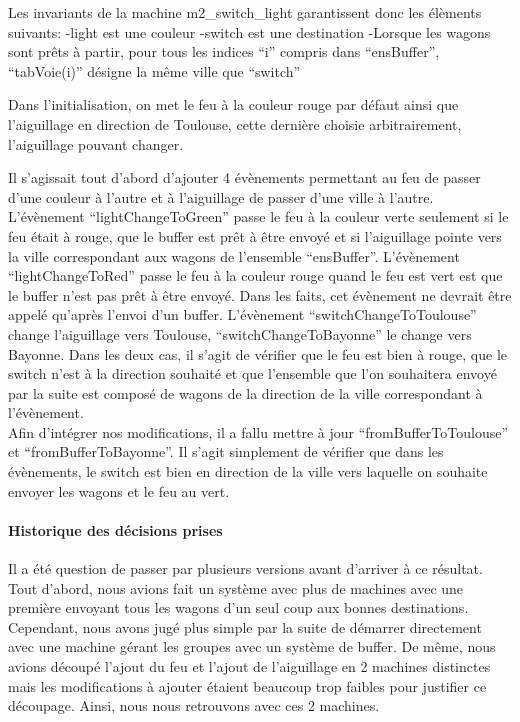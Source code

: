 Les invariants de la machine m2\_switch\_light garantissent donc les élèments suivants:
    -light est une couleur
    -switch est une destination
    -Lorsque les wagons sont prêts à partir, pour tous les indices ``i'' compris dans ``ensBuffer'', ``tabVoie(i)'' désigne la même ville
    que ``switch''

Dans l'initialisation, on met le feu à la couleur rouge par défaut ainsi que l'aiguillage en direction de Toulouse, cette dernière choisie
arbitrairement, l'aiguillage pouvant changer.

Il s'agissait tout d'abord d'ajouter 4 évènements permettant au feu de passer d'une couleur à l'autre et à l'aiguillage de passer d'une ville à
l'autre.
L'évènement ``lightChangeToGreen'' passe le feu à la couleur verte seulement si le feu était à rouge, que le buffer est prêt à être envoyé
et si l'aiguillage pointe vers la ville correspondant aux wagons de l'ensemble ``ensBuffer''.
L'évènement ``lightChangeToRed'' passe le feu à la couleur rouge quand le feu est vert est que le buffer n'est pas prêt à être envoyé. Dans les
faits, cet évènement ne devrait être appelé qu'après l'envoi d'un buffer.
L'évènement ``switchChangeToToulouse'' change l'aiguillage vers Toulouse, ``switchChangeToBayonne'' le change vers Bayonne. Dans les deux cas,
il s'agit de vérifier que le feu est bien à rouge, que le switch n'est à la direction souhaité et que l'ensemble que l'on souhaitera envoyé par
la suite est composé de wagons de la direction de la ville correspondant à l'évènement.
\\
Afin d'intégrer nos modifications, il a fallu mettre à jour ``fromBufferToToulouse'' et ``fromBufferToBayonne''. Il s'agit simplement de vérifier
que dans les évènements, le switch est bien en direction de la ville vers laquelle on souhaite envoyer les wagons et le feu au vert.

\paragraph{Historique des décisions prises}

Il a été question de passer par plusieurs versions avant d'arriver à ce résultat. Tout d'abord, nous avions fait un système avec plus de machines
avec une première envoyant tous les wagons d'un seul coup aux bonnes destinations. Cependant, nous avons jugé plus simple par la suite de
démarrer directement avec une machine gérant les groupes avec un système de buffer. De même, nous avions découpé l'ajout du feu et l'ajout
de l'aiguillage en 2 machines distinctes mais les modifications à ajouter étaient beaucoup trop faibles pour justifier ce découpage. Ainsi,
nous nous retrouvons avec ces 2 machines.

